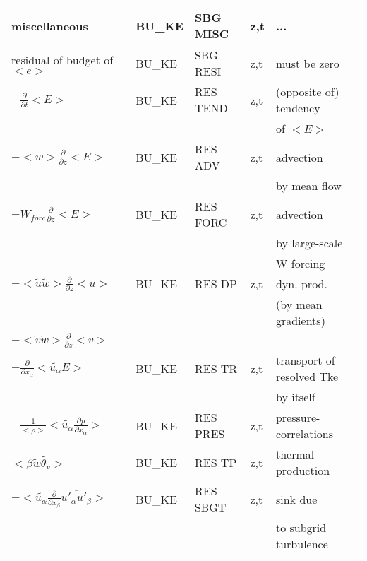 \begin{center}
\begin{tabular}{||p{5cm}|>{\centering}p{2cm}|>{\centering}p{2.5cm}|>{\centering}p{0.5cm}|p{5.5cm }||}
\hline
{\rm miscellaneous} & BU\_KE & SBG MISC & z,t & ... \\
\hline
{\rm residual of budget of} $<e>$ & BU\_KE & SBG RESI & z,t & must be zero \\
\hline
$-\frac{\partial }{\partial t}<E>$ & BU\_KE & RES TEND & z,t & (opposite of) tendency\\
 & & & &  of $<E>$\\
\hline
$-<w>\frac{\partial}{\partial z}<E>$ & BU\_KE & RES ADV  & z,t & advection \\
 & & & & by mean flow\\
\hline
$-W_{forc}\frac{\partial}{\partial z}<E>$ & BU\_KE & RES FORC & z,t & advection \\
 & & & & by large-scale\\
 & & & & W forcing\\
\hline
$-<\tilde{u}\tilde{w}>\frac{\partial }{\partial z}<u>$ & BU\_KE & RES DP   & z,t & dyn. prod. \\
 & & & &(by mean gradients)\\
$-<\tilde{v}\tilde{w}>\frac{\partial }{\partial z}<v>$ &  &  & & \\
\hline
$-\frac{\partial}{\partial x_\alpha} <\tilde{u_\alpha} E>$ & BU\_KE & RES TR   & z,t & transport of resolved Tke\\
 & & & &by itself \\
\hline
$- \frac{1}{<\rho>}<\tilde{u_\alpha} \frac{\partial \tilde{p}}{\partial x_\alpha}>$ & BU\_KE & RES PRES & z,t & pressure-correlations \\
\hline
$ <\beta  \tilde{w}\tilde{\theta_v}> $  & BU\_KE & RES TP   & z,t & thermal production \\
\hline
$- <\tilde{u_\alpha}\frac{\partial}{\partial x_\beta}\overline{u'_\alpha u'_\beta}> $ & BU\_KE & RES SBGT & z,t & sink due \\
 & & & &to subgrid turbulence \\
\hline
\hline
\end{tabular}
\end{center}

